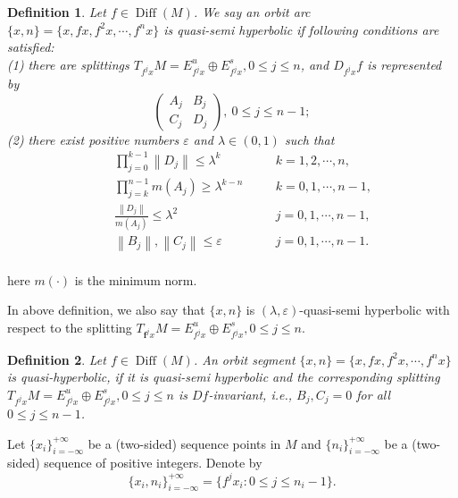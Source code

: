 \documentclass[12pt]{article}
\newtheorem{definition}{Definition}[section]
\begin{document}
\begin{definition}\label{defn:2.1}
	Let $f \in\operatorname{Diff}(M)$. We say an orbit arc $ \{x,n\}=\{x,fx,f^2x,\cdots,f^nx\} $ is quasi-semi hyperbolic if following conditions are satisfied:\\
	(1) there are splittings $T_{f^jx}M=E^u_{f^jx}\oplus E^s_{f^jx}, 0\leqslant j\leqslant n$, and $D_{f^jx}f$ is represented by
	$$ \left(\begin{array}{lll}
		A_{j}&B_{j}\\
		C_{j}&D_{j}
	\end{array}\right),\ 0\leqslant j\leqslant n-1;$$
	(2) there exist positive numbers $ \varepsilon $ and $\lambda\in (0,1) $ such that
	\begin{equation}\label{2.1}
		\begin{aligned}
			&\quad \prod_{j=0}^{k-1} \left\|D_{j}\right\|\leqslant \lambda^{k} &&\quad  k=1,2,\cdots,n,\\
			&\quad \prod_{j=k}^{n-1} m(A_{j})\geqslant \lambda^{k-n} &&\quad  k=0,1,\cdots,n-1,\\
			&\quad \frac{\left\|D_{j}\right\|}{m(A_{j})}\leqslant\lambda^{2}  &&\quad j=0,1,\cdots,n-1,\\
			&\quad \left\|B_{j}\right\|,\left\|C_{j}\right\|\leqslant \varepsilon && \quad j=0,1,\cdots,n-1. \\
		\end{aligned}
	\end{equation}
\end{definition}
here $ m(\cdot) $ is the minimum norm.

In above definition, we also say that $\{x,n\}$ is $(\lambda,\varepsilon)$-quasi-semi hyperbolic with respect to the splitting $T_{\boldsymbol f^jx}M=E^u_{f^jx}\oplus E^s_{f^jx}, 0\leqslant j\leqslant n$.

\begin{definition}\label{defn:2.2}
	\hfuzz=5pt %
	\overfullrule=0pt
	Let $f \in \operatorname{Diff}(M)$. An orbit segment  $\{x ,n\}=\{x,fx,f^2x,\cdots,f^nx\}$ is quasi-hyperbolic, if it is quasi-semi hyperbolic and the corresponding  splitting 
	$T_{ f^jx}M=E^u_{ f^jx}\oplus E^s_{ f^jx}, 0\leqslant j\leqslant n$ is $Df$-invariant, i.e., $B_{j},C_{j}=0$ for all $0\leqslant j\leqslant n-1$.
\end{definition}

Let $\{x_{i}\}_{i=-\infty}^{+\infty}$ be a (two-sided) sequence points in $ M $ and $\{n_{i}\}_{i=-\infty}^{+\infty}$ be a (two-sided) sequence of positive integers. Denote by $$ \{x_{i},n_{i}\}_{i=-\infty}^{+\infty}=\{f^{j}x_{i}:0\leqslant j\leqslant n_{i}-1\}.$$
\end{document}
